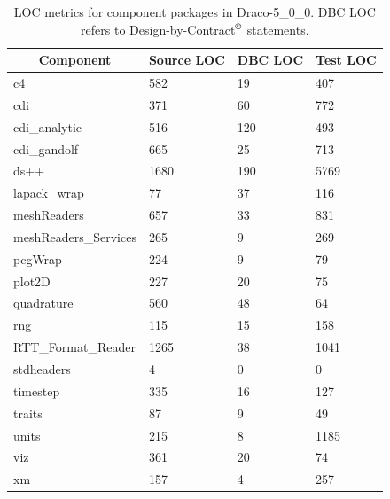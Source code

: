 \documentclass[note]{ResearchNote_pdf}
\newcommand{\draco}{Draco}
\newcommand{\dracor}{\draco-5\_0\_0}
\begin{document}
\begin{table}
  \caption{
    LOC metrics for component packages in \dracor.  DBC LOC refers to
    Design-by-Contract$^{\copyright}$ statements. 
  }
  \label{tab:loc}
  \begin{center}
    \begin{tabular}{llll}\hline\hline
      \multicolumn{1}{c}{Component} &
      \multicolumn{1}{c}{Source LOC} &
      \multicolumn{1}{c}{DBC LOC} &
      \multicolumn{1}{c}{Test LOC} \\\hline
      
      c4        &       582     &       19      &       407     \\
      cdi       &       371     &       60      &       772     \\
      cdi\_analytic      &       516     &       120     &       493     \\
      cdi\_gandolf       &       665     &       25      &       713     \\
      ds++      &       1680    &       190     &       5769    \\
      lapack\_wrap       &       77      &       37      &       116     \\
      meshReaders       &       657     &       33      &       831     \\
      meshReaders\_Services      &       265     &       9       & 269 \\
      pcgWrap   &       224     &       9       &       79      \\
      plot2D    &       227     &       20      &       75      \\
      quadrature        &       560     &       48      &       64      \\
      rng       &       115     &       15      &       158     \\
      RTT\_Format\_Reader &       1265    &       38      &       1041    \\
      stdheaders        &       4       &       0       &       0       \\
      timestep  &       335     &       16      &       127     \\
      traits    &       87      &       9       &       49      \\
      units     &       215     &       8       &       1185    \\
      viz       &       361     &       20      &       74      \\
      xm        &       157     &       4       &       257     \\
      \hline\hline
    \end{tabular}
  \end{center}
\end{table}
\end{document}
